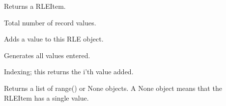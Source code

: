 \documentclass[letterpaper,10pt,english]{sphinxmanual}
\begin{document}
\begin{fulllineitems}

\begin{fulllineitems}
\label{\detokenize{ref/LIS/core/Rle:TotalDepth.LIS.core.Rle.RLE.__getitem__}}
Returns a RLEItem.

\end{fulllineitems}


\begin{fulllineitems}
\label{\detokenize{ref/LIS/core/Rle:TotalDepth.LIS.core.Rle.RLE.numValues}}
Total number of record values.

\end{fulllineitems}


\begin{fulllineitems}
\label{\detokenize{ref/LIS/core/Rle:TotalDepth.LIS.core.Rle.RLE.add}}
Adds a value to this RLE object.

\end{fulllineitems}


\begin{fulllineitems}
\label{\detokenize{ref/LIS/core/Rle:TotalDepth.LIS.core.Rle.RLE.values}}
Generates all values entered.

\end{fulllineitems}


\begin{fulllineitems}
\label{\detokenize{ref/LIS/core/Rle:TotalDepth.LIS.core.Rle.RLE.value}}
Indexing; this returns the i’th value added.

\end{fulllineitems}


\begin{fulllineitems}
\label{\detokenize{ref/LIS/core/Rle:TotalDepth.LIS.core.Rle.RLE.rangeList}}
Returns a list of range() or None objects. A None object means that
the RLEItem has a single value.


\end{fulllineitems}
\end{fulllineitems}
\end{document}
